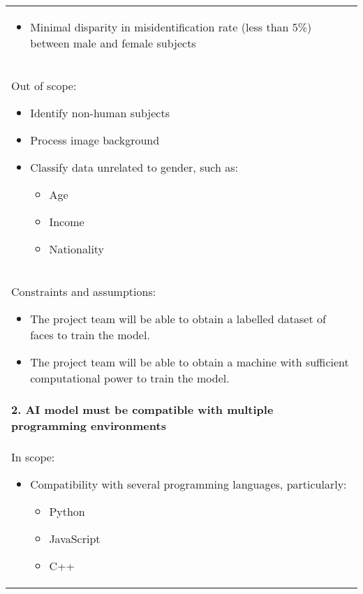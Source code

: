 \begin{longtable}{ | p{} l | }
{\begin{itemize}
\begin{itemize}
                    \item Mouth
                \end{itemize}
            \item Minimal disparity in misidentification rate (less than 5\%) between male and female subjects
        \end{itemize}
    } \\
    \multicolumn{2}{|p{\textwidth}|}{\hspace{0.6cm}Out of scope:
        \begin{itemize}
            \item Identify non-human subjects
            \item Process image background
            \item Classify data unrelated to gender, such as:
                \begin{itemize}
                    \item Age
                    \item Income
                    \item Nationality
                \end{itemize}
        \end{itemize}
    } \\
    \multicolumn{2}{|p{\textwidth}|}{\hspace{0.6cm}Constraints and assumptions:
        \begin{itemize}
            \item The project team will be able to obtain a labelled dataset of faces to train the model.
            \item The project team will be able to obtain a machine with sufficient computational power to train the model.
        \end{itemize}
    } \\
    \multicolumn{2}{|p{\textwidth}|}{\textbf{2. AI model must be compatible with multiple programming environments}} \\
    \multicolumn{2}{|p{\textwidth}|}{\hspace{0.6cm}In scope:
        \begin{itemize}
            \item Compatibility with several programming languages, particularly:
                \begin{itemize}
                    \item Python
                    \item JavaScript
                    \item C++

\end{itemize}
\end{itemize}}
\end{longtable}
